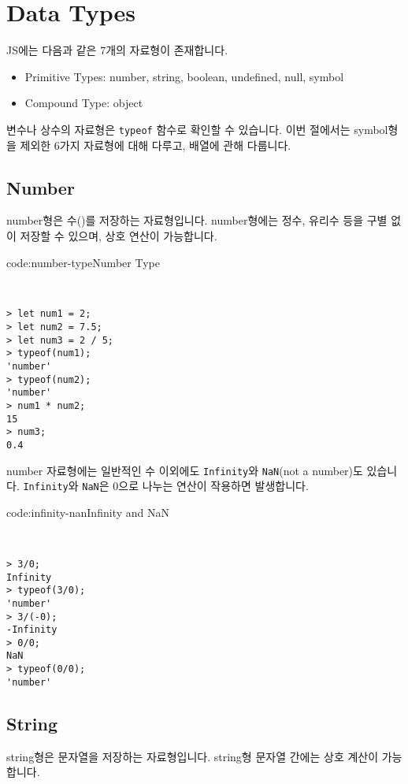 \section{Data Types} \label{sect:data-types}

JS에는 다음과 같은 7개의 자료형이 존재합니다. 

\begin{itemize}
    \item Primitive Types: number, string, boolean, undefined, null, symbol
    \item Compound Type: object
\end{itemize}

변수나 상수의 자료형은 \texttt{typeof} 함수로 확인할 수 있습니다. 이번 절에서는 symbol형을 제외한 6가지 자료형에 대해 다루고, 배열에 관해 다룹니다. 

\subsection*{Number}

number형은 수()를 저장하는 자료형입니다. number형에는 정수, 유리수 등을 구별 없이 저장할 수 있으며, 상호 연산이 가능합니다.

\begin{codeenv}{code:number-type}{Number Type}\begin{verbatim}


> let num1 = 2;
> let num2 = 7.5;
> let num3 = 2 / 5;
> typeof(num1);
'number'
> typeof(num2);
'number'
> num1 * num2;
15
> num3;
0.4
\end{verbatim}
\end{codeenv}

number 자료형에는 일반적인 수 이외에도 \texttt{Infinity}와 \texttt{NaN}(not a number)도 있습니다. \texttt{Infinity}와 \texttt{NaN}은 0으로 나누는 연산이 작용하면 발생합니다. 

\begin{codeenv}{code:infinity-nan}{Infinity and NaN}\begin{verbatim}


> 3/0;
Infinity
> typeof(3/0);
'number'
> 3/(-0);
-Infinity
> 0/0;
NaN
> typeof(0/0);
'number'
\end{verbatim}
\end{codeenv}

\subsection*{String}

string형은 문자열을 저장하는 자료형입니다. string형 문자열 간에는 상호 계산이 가능합니다.

